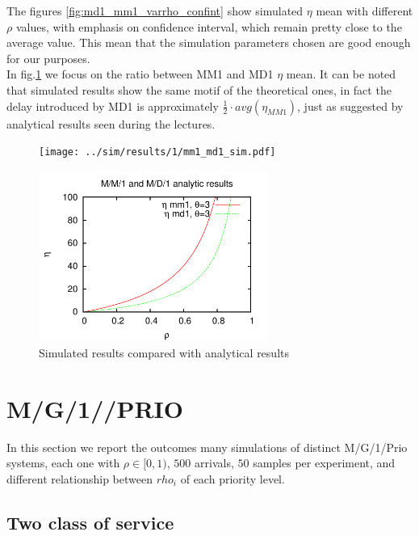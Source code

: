 \documentclass{llncs}
\newcommand{\labelsec}[1]{\label{sec:#1}}
\begin{document}
The figures \ref{fig:md1_mm1_varrho_confint} show simulated $\eta$ mean with different $\rho$ values, with emphasis on confidence interval, which remain pretty close to the average value. This mean that the simulation parameters chosen are good enough for our purposes.\\
In fig.\ref{fig:md1_mm1_varrho_compare} we focus on the ratio between MM1 and MD1 $\eta$ mean. It can be noted that simulated results show the same motif of the theoretical ones, in fact the delay introduced by MD1 is approximately $\frac{1}{2} \cdot avg(\eta_ {MM1})$, just as suggested by analytical results seen during the lectures.

\begin{figure}
\begin{minipage}[b]{7.5cm}
\centering
\texttt{[image: ../sim/results/1/mm1\_md1\_sim.pdf]}
\end{minipage}\qquad
\begin{minipage}[b]{7.5cm}
\centering
\includegraphics[width=7.5cm]{../sim/results/1/mm1_md1_theorical.pdf}
\end{minipage}
\caption{Simulated results compared with analytical results}
\label{fig:md1_mm1_varrho_compare}
\end{figure}


\newpage
\section{M/G/1//PRIO}
\labelsec{MG1PRIO}

In this section we report the outcomes many simulations of distinct M/G/1/Prio systems, each one with $\rho \in [0,1)$, $500$ arrivals, $50$ samples per experiment, and different relationship between $rho_i$ of each priority level.


\subsection{Two class of service}
\labelsec{MG1PRIO_2class}
\end{document}
